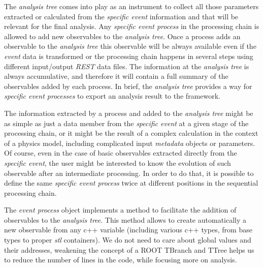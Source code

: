 The \emph{analysis tree} comes into play as an instrument to collect all those parameters extracted or calculated from the \emph{specific event} information and that will be relevant for the final analysis.  Any \emph{specific event process} in the processing chain is allowed to add new observables to the \emph{analysis tree}. Once a process adds an observable to the \emph{analysis tree} this observable will be always available even if the \emph{event} data is transformed or the processing chain happens in several steps using different input/output \emph{REST} data files. The information at the \emph{analysis tree} is always accumulative, and therefore it will contain a full summary of the observables added by each process.
In brief, the \emph{analysis tree} provides a way for \emph{specific event processes} to export an analysis result to the framework.

The information extracted by a process and added to the \emph{analysis tree} might be as simple as just a data member from the \emph{specific event} at a given stage of the processing chain, or it might be the result of a complex calculation in the context of a physics model, including complicated input \emph{metadata} objects or parameters. Of course, even in the case of basic observables extracted directly from the \emph{specific event}, the user might be interested to know the evolution of such observable after an intermediate processing. In order to do that, it is possible to define the same \emph{specific event process} twice at different positions in the sequential processing chain.





The \emph{event process} object implements a method to facilitate the addition of observables to the \emph{analysis tree}. This method allows to create automatically a new observable from any c++ variable (including various c++ types, from base types to proper \emph{stl} containers). We do not need to care about global values and their addresses, weakening the concept of a ROOT TBranch and TTree helps us to reduce the number of lines in the code, while focusing more on analysis.

